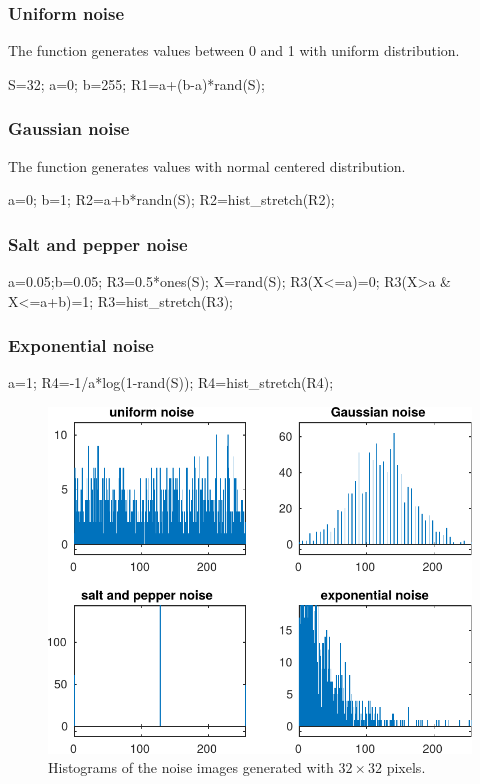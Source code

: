\subsubsection{Uniform noise}
The \matlabregistered{}  function generates values between 0 and 1 with uniform distribution.

\begin{matlab}
S=32; a=0; b=255;
R1=a+(b-a)*rand(S);
\end{matlab}

\subsubsection{Gaussian noise}
The \matlabregistered{}  function generates values with normal centered distribution.
\begin{matlab}
a=0; b=1;
R2=a+b*randn(S);
R2=hist_stretch(R2);
\end{matlab}

\subsubsection{Salt and pepper noise}
\begin{matlab}
a=0.05;b=0.05;
R3=0.5*ones(S);
X=rand(S);
R3(X<=a)=0;
R3(X>a & X<=a+b)=1;
R3=hist_stretch(R3); 
\end{matlab}


\subsubsection{Exponential noise}
\begin{matlab}
a=1;
R4=-1/a*log(1-rand(S));
R4=hist_stretch(R4); 
\end{matlab}

\begin{figure}[htbp]
 \centering
 \includegraphics[width=\textwidth]{histograms_noise.pdf}
 \caption{Histograms of the noise images generated with $32\times 32$ pixels.}
 \label{fig:image_restoration_denoising:matlab:histograms}
\end{figure}


